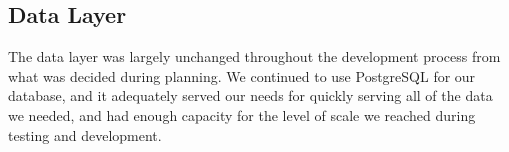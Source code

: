 \subsection{Data Layer}

The data layer was largely unchanged throughout the development process from what was decided during planning. We continued to use PostgreSQL for our database, and it adequately served our needs for quickly serving all of the data we needed, and had enough capacity for the level of scale we reached during testing and development.